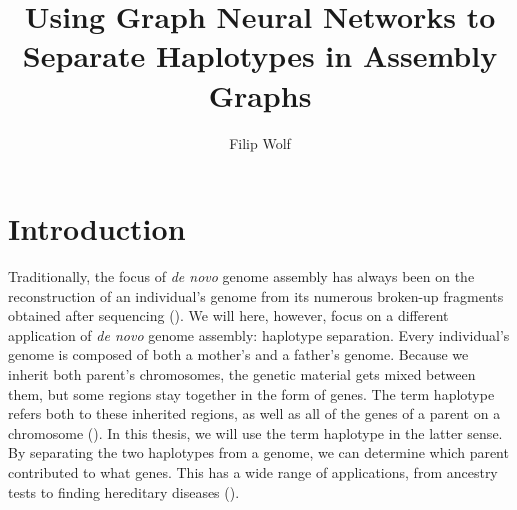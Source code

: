 \documentclass[times, utf8, diplomski, english]{fer_eng}
\begin{document}

\title{Using Graph Neural Networks to Separate Haplotypes in Assembly Graphs}

\author{Filip Wolf}

\maketitle



\zahvala{}

\tableofcontents

\chapter{Introduction}

Traditionally, the focus of \textit{de novo} genome assembly has always been on the reconstruction of an individual's genome from its numerous broken-up fragments obtained after sequencing (\cite{de_novo2}). We will here, however, focus on a different application of \textit{de novo} genome assembly: haplotype separation. Every individual's genome is composed of both a mother's and a father's genome. Because we inherit both parent's chromosomes, the genetic material gets mixed between them, but some regions stay together in the form of genes. The term haplotype refers both to these inherited regions, as well as all of the genes of a parent on a chromosome (\cite{haplotype}). In this thesis, we will use the term haplotype in the latter sense. By separating the two haplotypes from a genome, we can determine which parent contributed to what genes. This has a wide range of applications, from ancestry tests to finding hereditary diseases (\cite{haplotype_usage}).         
\end{document}
